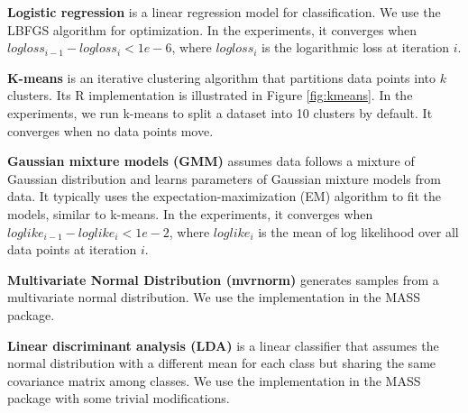 \noindent \textbf{Logistic regression} is a linear regression model for
classification. We use the LBFGS algorithm \cite{lbfgs} for optimization.
In the experiments, it converges when
$logloss_{i-1}-logloss_i < 1e-6$, where $logloss_i$ is the logarithmic loss
at iteration $i$.

\noindent \textbf{K-means} is an iterative clustering algorithm that
partitions data points into $k$ clusters. Its R implementation is illustrated
in Figure \ref{fig:kmeans}. In the experiments, we run k-means to split
a dataset into 10 clusters by default. It converges when no data points
move.

\noindent \textbf{Gaussian mixture models (GMM)} assumes data follows
a mixture of Gaussian distribution and learns parameters of Gaussian mixture
models from data. It typically uses the expectation-maximization (EM)
algorithm \cite{em} to fit the models, similar to k-means. In the experiments,
it converges when $loglike_{i-1} - loglike_i < 1e-2$, where $loglike_i$
is the mean of log likelihood over all data points at iteration $i$.

\noindent \textbf{Multivariate Normal Distribution (mvrnorm)} generates
samples from a multivariate normal distribution. We use
the implementation in the MASS package.

\noindent \textbf{Linear discriminant analysis (LDA)} is a linear classifier
that assumes the normal distribution with a different mean for each class
but sharing the same covariance matrix among classes. We use the implementation
in the MASS package with some trivial modifications.

